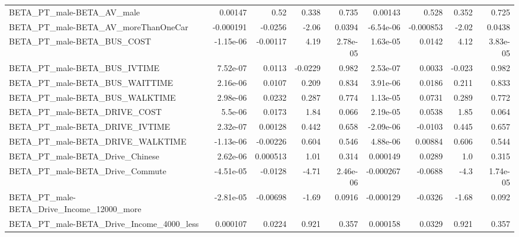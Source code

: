 \begin{tabular}{lrrrrrrrr}
BETA\_PT\_male-BETA\_AV\_male                          &     0.00147 &         0.52 &     0.338 &    0.735 &    0.00143 &       0.528 &        0.352 &         0.725 \\
BETA\_PT\_male-BETA\_AV\_moreThanOneCar                &   -0.000191 &      -0.0256 &     -2.06 &   0.0394 &  -6.54e-06 &   -0.000853 &        -2.02 &        0.0438 \\
BETA\_PT\_male-BETA\_BUS\_COST                         &   -1.15e-06 &     -0.00117 &      4.19 & 2.78e-05 &   1.63e-05 &      0.0142 &         4.12 &      3.83e-05 \\
BETA\_PT\_male-BETA\_BUS\_IVTIME                       &    7.52e-07 &       0.0113 &   -0.0229 &    0.982 &   2.53e-07 &      0.0033 &       -0.023 &         0.982 \\
BETA\_PT\_male-BETA\_BUS\_WAITTIME                     &    2.16e-06 &       0.0107 &     0.209 &    0.834 &   3.91e-06 &      0.0186 &        0.211 &         0.833 \\
BETA\_PT\_male-BETA\_BUS\_WALKTIME                     &    2.98e-06 &       0.0232 &     0.287 &    0.774 &   1.13e-05 &      0.0731 &        0.289 &         0.772 \\
BETA\_PT\_male-BETA\_DRIVE\_COST                       &     5.5e-06 &       0.0173 &      1.84 &    0.066 &   2.19e-05 &      0.0538 &         1.85 &         0.064 \\
BETA\_PT\_male-BETA\_DRIVE\_IVTIME                     &    2.32e-07 &      0.00128 &     0.442 &    0.658 &  -2.09e-06 &     -0.0103 &        0.445 &         0.657 \\
BETA\_PT\_male-BETA\_DRIVE\_WALKTIME                   &   -1.13e-06 &     -0.00226 &     0.604 &    0.546 &   4.88e-06 &     0.00884 &        0.606 &         0.544 \\
BETA\_PT\_male-BETA\_Drive\_Chinese                    &    2.62e-06 &     0.000513 &      1.01 &    0.314 &   0.000149 &      0.0289 &          1.0 &         0.315 \\
BETA\_PT\_male-BETA\_Drive\_Commute                    &   -4.51e-05 &      -0.0128 &     -4.71 & 2.46e-06 &  -0.000267 &     -0.0688 &         -4.3 &      1.74e-05 \\
BETA\_PT\_male-BETA\_Drive\_Income\_12000\_more          &   -2.81e-05 &     -0.00698 &     -1.69 &   0.0916 &  -0.000129 &     -0.0326 &        -1.68 &         0.092 \\
BETA\_PT\_male-BETA\_Drive\_Income\_4000\_less           &    0.000107 &       0.0224 &     0.921 &    0.357 &   0.000158 &      0.0329 &        0.921 &         0.357 \\

\end{tabular}
